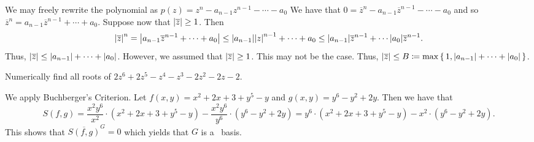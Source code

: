 \documentclass[letterpaper, 11pt, oneside]{book}
\begin{document}
\begin{sol}\label{ex:UAG_2.1.3}
  We may freely rewrite the polynomial as $p(z) = z^{n} - a_{n - 1}z^{n - 1} - \cdots - a_{0}$
  We have that $0 = \overline{z}^{n} - a_{n - 1}\overline{z}^{n - 1} - \cdots - a_{0}$ and so $\overline{z}^{n} = a_{n - 1}\overline{z}^{n - 1} + \cdots + a_{0}$.
  Suppose now that $\abs{\overline{z}} \geq 1$.
  Then
  \[
    \abs{\overline{z}}^{n} = \abs{a_{n - 1}\overline{z}^{n - 1} + \cdots + a_{0}} \leq \abs{a_{n - 1}}\abs{z}^{n - 1} + \cdots + a_{0} \leq \abs{a_{n - 1}}\overline{z}^{n - 1} + \cdots \abs{a_{0}}\overline{z}^{n - 1}.
  \]
  Thus, $\abs{\overline{z}} \leq \abs{a_{n - 1}} + \cdots + \abs{a_{0}}$.
  However, we assumed that $\abs{\overline{z}} \geq 1$.
  This may not be the case.
  Thus, $\abs{\overline{z}} \leq B \coloneqq \max\set{1, \abs{a_{n - 1}} + \cdots + \abs{a_{0}}}$.
\end{sol}

\begin{sol}\label{ex:UAG_2.1.4}
  Numerically find all roots of $2z^{6} + 2z^{5} - z^{4} - z^{3} - 2z^{2} - 2z - 2$.
\end{sol}

\clearpage

\begin{sol}\label{ex:UAG_2.1.5}
  We apply Buchberger's Criterion.
  Let $f(x, y) = x^{2} + 2x + 3 + y^{5} - y$ and $g(x, y) = y^{6} - y^{2} + 2y$.
  Then we have that
  \[
    S(f, g) = \frac{x^{2}y^{6}}{x^{2}} \cdot (x^{2} + 2x + 3 + y^{5} - y) - \frac{x^{2}y^{6}}{y^{6}} \cdot (y^{6} - y^{2} + 2y) = y^{6} \cdot (x^{2} + 2x + 3 + y^{5} - y) - x^{2} \cdot (y^{6} - y^{2} + 2y).
  \]
  This shows that $\overline{S(f, g)}^{G} = 0$ which yields that $G$ is a \Grobner\ basis.
\end{sol}

\begin{sol}\label{ex:UAG_2.1.6}
\end{sol}

\begin{sol}\label{ex:UAG_2.1.7}
\end{sol}

\clearpage
\end{document}
